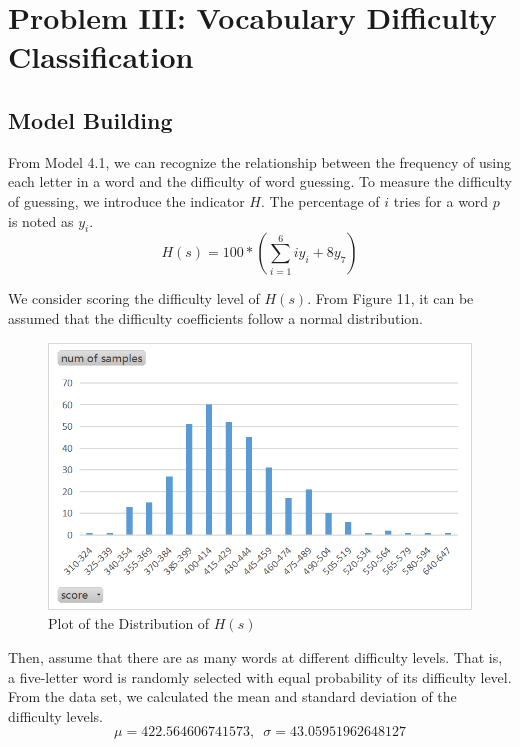 \documentclass[12pt]{article}
\begin{document}

\section{Problem III: Vocabulary Difficulty Classification}

\subsection{Model Building}


From Model 4.1, we can recognize the relationship between the frequency of using each letter in a word and the difficulty of word guessing. To measure the difficulty of guessing, we introduce the indicator $ H$. The percentage of $i$ tries for a word $p$ is noted as $y_i$.
\begin{equation}
    H(s) =100* (\sum_{i=1}^{6}iy_i+8y_7)
\end{equation}    

We consider scoring the difficulty level of $H(s)$. From Figure 11, it can be assumed that the difficulty coefficients follow a normal distribution.

\begin{figure}[H]
    \centering
    \includegraphics[scale=0.7]{3_1.png}
    \caption{Plot of the Distribution of $H(s)$ }
\end{figure}

Then, assume that there are as many words at different difficulty levels. That is, a five-letter word is randomly selected with equal probability of its difficulty level.
From the data set, we calculated the mean and standard deviation of the difficulty levels.
\begin{equation}
    \mu =422.564606741573,\enspace \sigma = 43.05951962648127
\end{equation} 
\end{document}
